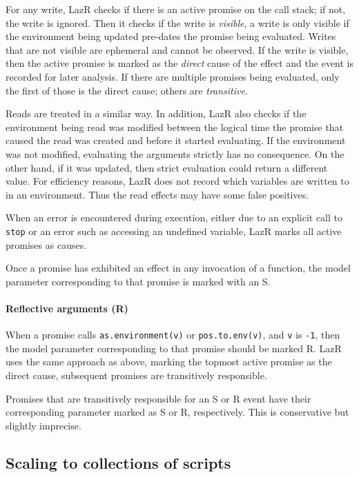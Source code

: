 \documentclass[review,nonacm,screen,acmsmall,anonymous=true]{acmart}
\newcommand{\code}[1]{\lstinline |#1|\xspace}
\renewcommand{\c}[1]{\lstinline |#1|\xspace}
\newcommand{\lazr}{{\sf LazR}\xspace}
\begin{document}
For any write, \lazr checks if there is an active promise on the call stack; if
not, the write is ignored. Then it checks if the write is \emph{visible}, a
write is only visible if the environment being updated pre-dates the promise
being evaluated. Writes that are not visible are ephemeral and cannot be
observed. If the write is visible, then the active promise is marked as the
\emph{direct} cause of the effect and the event is recorded for later analysis.
If there are multiple promises being evaluated, only the first of those is the
direct cause; others are \emph{transitive}.

Reads are treated in a similar way. In addition, \lazr also checks if the
environment being read was modified between the logical time the promise that
caused the read was created and before it started evaluating. If the environment
was not modified, evaluating the arguments strictly has no consequence. On the
other hand, if it was updated, then strict evaluation could return a different
value.
For efficiency reasons, \lazr does not record which variables are written
to in an environment. Thus the read effects may have some false positives.

When an error is encountered during execution, either due to an explicit call to
\c{stop} or an error such as accessing an undefined variable, \lazr marks all
active promises as causes.

Once a promise has exhibited an effect in any invocation of a function, the
model parameter corresponding to that promise is marked with an S.

\paragraph{Reflective arguments (R)}
When a promise calls \code{as.environment(v)} or \code{pos.to.env(v)}, and
\c v is \c{-1}, then the model parameter corresponding to that promise should be
marked R. \lazr uses the same approach as above, marking the topmost active
promise as the direct cause, subsequent promises are transitively responsible.

\medskip

Promises that are transitively responsible for an S or R event have their
corresponding parameter marked as S or R, respectively. This is conservative but
slightly imprecise.

\newpage
\subsection{Scaling to collections of scripts}
\end{document}
